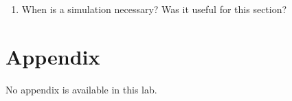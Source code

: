 \documentclass[12pt]{article}
\begin{document}
\begin{enumerate}
  \item When is a simulation necessary? Was it useful for this section?
\end{enumerate}

\section*{Appendix}

No appendix is available in this lab.



\end{document}
